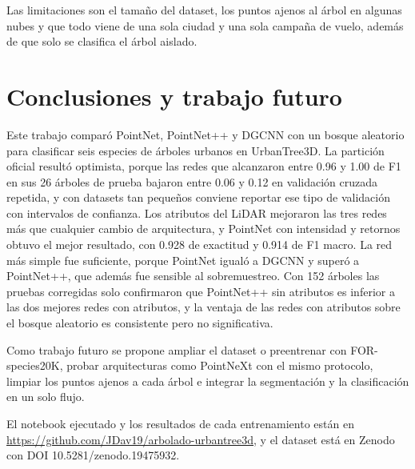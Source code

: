 \documentclass[preprint,12pt]{elsarticle}
\begin{document}
Las limitaciones son el tamaño del dataset, los puntos ajenos al árbol en algunas nubes y que todo viene de una sola ciudad y una sola campaña de vuelo, además de que solo se clasifica el árbol aislado.

\section{Conclusiones y trabajo futuro}
\label{sec:conclusiones}

Este trabajo comparó PointNet, PointNet++ y DGCNN con un bosque aleatorio para clasificar seis especies de árboles urbanos en UrbanTree3D. La partición oficial resultó optimista, porque las redes que alcanzaron entre 0.96 y 1.00 de F1 en sus 26 árboles de prueba bajaron entre 0.06 y 0.12 en validación cruzada repetida, y con datasets tan pequeños conviene reportar ese tipo de validación con intervalos de confianza. Los atributos del LiDAR mejoraron las tres redes más que cualquier cambio de arquitectura, y PointNet con intensidad y retornos obtuvo el mejor resultado, con 0.928 de exactitud y 0.914 de F1 macro. La red más simple fue suficiente, porque PointNet igualó a DGCNN y superó a PointNet++, que además fue sensible al sobremuestreo. Con 152 árboles las pruebas corregidas solo confirmaron que PointNet++ sin atributos es inferior a las dos mejores redes con atributos, y la ventaja de las redes con atributos sobre el bosque aleatorio es consistente pero no significativa.

Como trabajo futuro se propone ampliar el dataset o preentrenar con FOR-species20K, probar arquitecturas como PointNeXt con el mismo protocolo, limpiar los puntos ajenos a cada árbol e integrar la segmentación y la clasificación en un solo flujo.

El notebook ejecutado y los resultados de cada entrenamiento están en \url{https://github.com/JDav19/arbolado-urbantree3d}, y el dataset está en Zenodo con DOI 10.5281/zenodo.19475932.

\renewcommand{\bibfont}{\footnotesize}
\setlength{\bibsep}{0pt}


\end{document}
